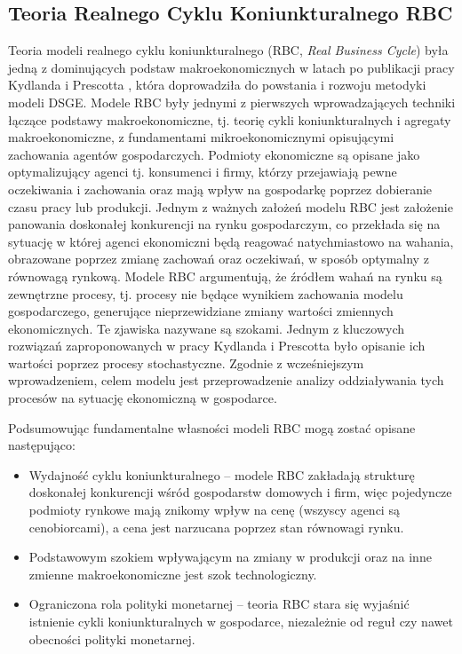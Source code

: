 \subsection{Teoria Realnego Cyklu Koniunkturalnego RBC}

Teoria modeli realnego cyklu koniunkturalnego (RBC, \emph{Real Business Cycle}) była jedną z dominujących podstaw makroekonomicznych w latach po publikacji pracy Kydlanda i Prescotta \cite{prescott_kydland}, która doprowadziła do powstania i rozwoju metodyki modeli DSGE. Modele RBC były jednymi z pierwszych wprowadzających techniki łączące podstawy makroekonomiczne, tj. teorię cykli koniunkturalnych i agregaty makroekonomiczne, z fundamentami mikroekonomicznymi opisującymi zachowania agentów gospodarczych. Podmioty ekonomiczne są opisane jako optymalizujący agenci tj. konsumenci i firmy, którzy przejawiają pewne oczekiwania i zachowania oraz mają wpływ na gospodarkę poprzez dobieranie czasu pracy lub produkcji. Jednym z ważnych założeń modelu RBC jest założenie panowania doskonałej konkurencji na rynku gospodarczym, co przekłada się na sytuację w której agenci ekonomiczni będą reagować natychmiastowo na wahania, obrazowane poprzez zmianę zachowań oraz oczekiwań, w sposób optymalny z równowagą rynkową. Modele RBC argumentują, że źródłem wahań na rynku są zewnętrzne procesy, tj. procesy nie będące wynikiem zachowania modelu gospodarczego, generujące nieprzewidziane zmiany wartości zmiennych ekonomicznych. Te zjawiska nazywane są szokami. Jednym z kluczowych rozwiązań zaproponowanych w pracy Kydlanda i Prescotta było opisanie ich wartości poprzez procesy stochastyczne. Zgodnie z wcześniejszym wprowadzeniem, celem modelu jest przeprowadzenie analizy oddziaływania tych procesów na sytuację ekonomiczną w gospodarce.

Podsumowując fundamentalne własności modeli RBC mogą zostać opisane następująco\cite{gali}:
\begin{itemize}
    \item Wydajność cyklu koniunkturalnego -- modele RBC zakładają strukturę doskonałej konkurencji wśród gospodarstw domowych i firm, więc pojedyncze podmioty rynkowe mają znikomy wpływ na cenę (wszyscy agenci są cenobiorcami), a cena jest narzucana poprzez stan równowagi rynku.
    \item Podstawowym szokiem wpływającym na zmiany w produkcji oraz na inne zmienne makroekonomiczne jest szok technologiczny.
    \item Ograniczona rola polityki monetarnej -- teoria RBC stara się wyjaśnić istnienie cykli koniunkturalnych w gospodarce, niezależnie od reguł czy nawet obecności polityki monetarnej.
\end{itemize}

